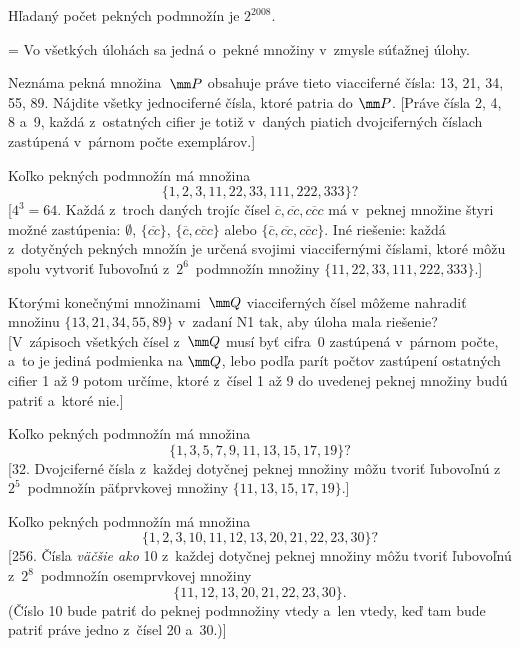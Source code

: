 {\odpoved
Hľadaný počet pekných podmnožín je $2^{2008}$.


{\everypar={}
Vo všetkých úlohách sa jedná o~pekné množiny v~zmysle súťažnej
úlohy.\par}

Neznáma pekná množina~$\mm P$ obsahuje práve tieto viacciferné
čísla: 13, 21, 34, 55, 89. Nájdite všetky jednociferné čísla,
ktoré patria do $\mm P$.
[Práve čísla 2, 4, 8 a~9, každá z~ostatných cifier je totiž v~daných piatich
dvojciferných číslach zastúpená v~párnom počte exemplárov.]

Koľko pekných podmnožín má množina
$$
\{1, 2, 3, 11, 22, 33, 111, 222, 333\} ?
$$
[$4^3=64$. Každá z~troch daných trojíc čísel $\overline{c},\overline{cc},\overline{ccc}$
má v~peknej množine štyri možné zastúpenia: $\emptyset$, $\{\overline{cc}\}$,
$\{\overline{c},\overline{ccc}\}$ alebo $\{\overline{c},\overline{cc},\overline{ccc}\}$. Iné
riešenie: každá z~dotyčných pekných množín je určená svojimi
viaccifernými číslami, ktoré môžu spolu vytvoriť ľubovoľnú
z~$2^6$~podmnožín množiny $\{11, 22, 33, 111, 222, 333\}$.]

Ktorými konečnými množinami~$\mm Q$ viacciferných čísel môžeme
nahradiť množinu $\{13, 21,\allowbreak 34, 55, 89\}$ v~zadaní N1 tak,
aby úloha mala riešenie? [V~zápisoch všetkých čísel z~$\mm Q$ musí byť
cifra~0 zastúpená v~párnom počte, a~to je jediná podmienka na
$\mm Q$, lebo podľa parít počtov zastúpení
ostatných cifier 1 až 9 potom určíme, ktoré z~čísel 1 až 9 do
uvedenej peknej množiny budú patriť a~ktoré nie.]

Koľko pekných podmnožín má množina
$$
\{1, 3, 5, 7, 9, 11, 13, 15, 17, 19\} ?
$$
[32. Dvojciferné čísla z~každej dotyčnej peknej množiny môžu tvoriť
ľubovoľnú z~$2^5$~podmnožín päťprvkovej množiny
$\{11, 13, 15, 17, 19\}$.]

Koľko pekných podmnožín má množina
$$
\{1, 2, 3, 10, 11, 12, 13, 20, 21, 22, 23, 30\} ?
$$
[256. Čísla {\it väčšie ako\/} 10 z~každej dotyčnej peknej množiny môžu
tvoriť ľubovoľnú z~$2^8$~podmnožín osemprvkovej množiny
$$
\{11, 12, 13, 20, 21, 22, 23, 30\}.
$$
(Číslo 10 bude patriť do peknej
podmnožiny vtedy a~len vtedy, keď tam bude patriť
práve jedno z~čísel 20 a~30.)]
}

